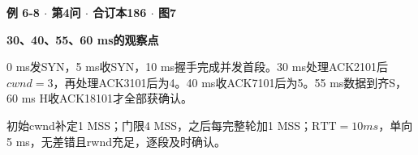 {\color{ink}\bfseries 例 6-8 \(\cdot \) 第4问 \(\cdot \) 合订本186 \(\cdot \) 图7}\par \textbf{30、40、55、60 ms的观察点}\par\vspace{2bp}0 ms发SYN，5 ms收SYN，10 ms握手完成并发首段。30 ms处理ACK2101后\(cwnd=\allowbreak{}3\)，再处理ACK3101后为4。40 ms收ACK7101后为5。55 ms数据到齐S，60 ms H收ACK18101才全部获确认。\par 初始cwnd补定1 MSS；门限4 MSS，之后每完整轮加1 MSS；\(\mathrm{RTT}=\allowbreak{}10 ms\)，单向5 ms，无差错且rwnd充足，逐段及时确认。
